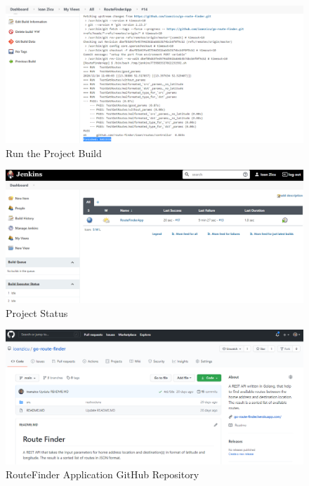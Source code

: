 \documentclass[12pt,a4paper,twoside]{article}
\begin{document}
\begin{figure}[h!]
    \centering
        \includegraphics[width=15cm]{images-aws/45-test-build-.png}
        \caption{Run the Project Build}
\end{figure}


\begin{figure}[h!]
    \centering
        \includegraphics[width=15cm]{images-aws/46-test-build-success-.png}
        \caption{Project Status}
\end{figure}


\begin{figure}[h!]
    \centering
        \includegraphics[width=15cm]{images-aws/47---github-project.png}
        \caption{RouteFinder Application GitHub Repository}
\end{figure}
\end{document}
